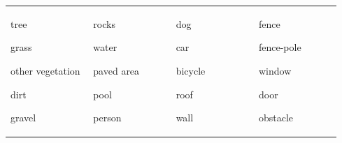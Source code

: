 \begin{tabular}%
{@{}p{0.24\linewidth}@{}p{0.24\linewidth}@{}p{0.24\linewidth}@{}p{0.24\linewidth}@{}}
\begin{minipage}[t]{\linewidth}
  \vspace*{-0cm}
  \begin{compactitem}
    \item tree
    \item grass
    \item other vegetation
    \item dirt
    \item gravel
  \end{compactitem}
\end{minipage} &
\begin{minipage}[t]{\linewidth}
  \vspace*{-0cm}
  \begin{compactitem}
    \item rocks
    \item water
    \item paved area
    \item pool
    \item person
  \end{compactitem}
\end{minipage} &
\begin{minipage}[t]{\linewidth}
  \vspace*{-0cm}
  \begin{compactitem}
    \item dog
    \item car
    \item bicycle
    \item roof
    \item wall
  \end{compactitem}
  
\end{minipage} &
\begin{minipage}[t]{\linewidth}
  \vspace*{-0cm}
  \begin{compactitem}
    \item fence
    \item fence-pole
    \item window
    \item door
    \item obstacle  
  \end{compactitem}
  
\end{minipage}
\end{tabular}

